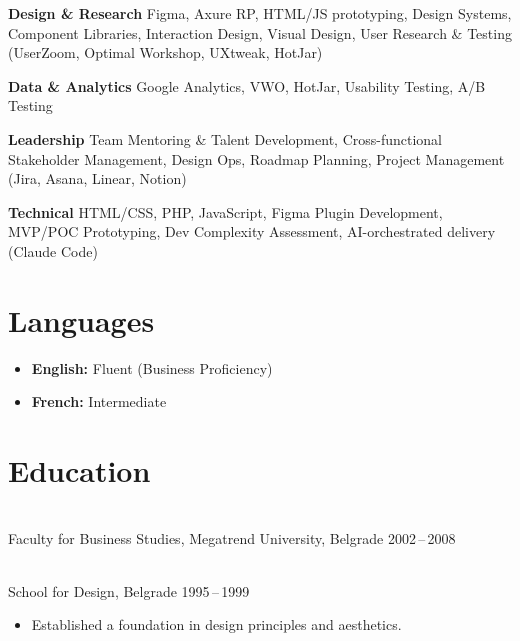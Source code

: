 \documentclass[a4paper,9.5pt]{article}
\newcommand{\skillblock}[2]{%
  {\small\bfseries #1}\newline%
  {\small\color{midgray}#2}%
}
\begin{document}
\vspace{2pt}
\noindent
\begin{minipage}[t]{0.475\textwidth}
  \skillblock{Design \& Research}{%
    Figma, Axure RP, HTML/JS prototyping,
    Design Systems, Component Libraries,
    Interaction Design, Visual Design,
    User Research \& Testing (UserZoom,
    Optimal Workshop, UXtweak, HotJar)}

  \vspace{12pt}
  \skillblock{Data \& Analytics}{%
    Google Analytics, VWO, HotJar,
    Usability Testing, A/B Testing}
\end{minipage}%
\hspace{0.05\textwidth}%
\begin{minipage}[t]{0.475\textwidth}
  \skillblock{Leadership}{%
    Team Mentoring \& Talent Development,
    Cross-functional Stakeholder Management,
    Design Ops, Roadmap Planning, Project
    Management (Jira, Asana, Linear, Notion)}

  \vspace{12pt}
  \skillblock{Technical}{%
    HTML/CSS, PHP, JavaScript,
    Figma Plugin Development,
    MVP/POC Prototyping,
    Dev Complexity Assessment,
    AI-orchestrated delivery (Claude Code)}
\end{minipage}

\section{Languages}

\begin{itemize}[leftmargin=1.2em, label={•},
    topsep=0pt, itemsep=2pt, parsep=0pt]
  \item {\small\textbf{English:} Fluent (Business Proficiency)}
  \item {\small\textbf{French:} Intermediate}
\end{itemize}

\section{Education}

\\[1pt]
{\small\color{midgray}Faculty for Business Studies,
Megatrend University, Belgrade \hfill 2002\,--\,2008}

\vspace{6pt}

\\[1pt]
{\small\color{midgray}School for Design, Belgrade
\hfill 1995\,--\,1999}
\begin{itemize}[leftmargin=1.2em, label={•},
    topsep=2pt, itemsep=0pt, parsep=0pt]
  \item {\small Established a foundation in design principles
        and aesthetics.}
\end{itemize}
\end{document}
